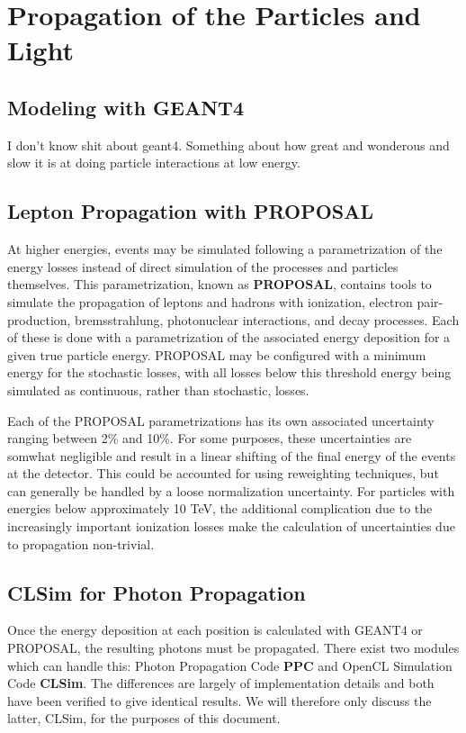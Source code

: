 \section{Propagation of the Particles and Light}
\label{sec:propagation}
\subsection{Modeling with GEANT4}
\label{subsec:geant}
I don't know shit about geant4.
Something about how great and wonderous and slow it is at doing particle interactions at low energy.

\subsection{Lepton Propagation with PROPOSAL}
\label{subsec:proposal}
At higher energies, events may be simulated following a parametrization of the energy losses instead of direct simulation of the processes and particles themselves.
This parametrization, known as \textbf{PROPOSAL}, contains tools to simulate the propagation of leptons and hadrons with ionization, electron pair-production, bremsstrahlung, photonuclear interactions, and decay processes.
Each of these is done with a parametrization of the associated energy deposition for a given true particle energy.
PROPOSAL may be configured with a minimum energy for the stochastic losses, with all losses below this threshold energy being simulated as continuous, rather than stochastic, losses.

Each of the PROPOSAL parametrizations has its own associated uncertainty ranging between 2\% and 10\%.
For some purposes, these uncertainties are somwhat negligible and result in a linear shifting of the final energy of the events at the detector.
This could be accounted for using reweighting techniques, but can generally be handled by a loose normalization uncertainty.
For particles with energies below approximately 10 TeV, the additional complication due to the increasingly important ionization losses make the calculation of uncertainties due to propagation non-trivial.


\subsection{CLSim for Photon Propagation}
\label{subsec:clsim}
Once the energy deposition at each position is calculated with GEANT4 or PROPOSAL, the resulting photons must be propagated. 
There exist two modules which can handle this: Photon Propagation Code \textbf{PPC} and OpenCL Simulation Code \textbf{CLSim}. 
The differences are largely of implementation details and both have been verified to give identical results.
We will therefore only discuss the latter, CLSim, for the purposes of this document.

